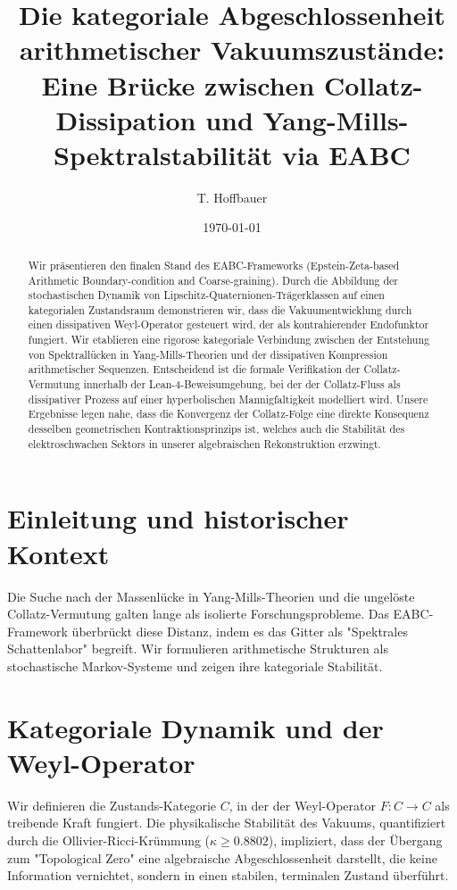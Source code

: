\documentclass[a4paper,11pt]{article}
\title{Die kategoriale Abgeschlossenheit arithmetischer Vakuumszustände: Eine Brücke zwischen Collatz-Dissipation und Yang-Mills-Spektralstabilität via EABC}
\author{T. Hoffbauer}
\date{\today}
\begin{document}
	
	\maketitle
	
	\begin{abstract}
		Wir präsentieren den finalen Stand des EABC-Frameworks (Epstein-Zeta-based Arithmetic Boundary-condition and Coarse-graining). Durch die Abbildung der stochastischen Dynamik von Lipschitz-Quaternionen-Trägerklassen auf einen kategorialen Zustandsraum demonstrieren wir, dass die Vakuumentwicklung durch einen dissipativen Weyl-Operator gesteuert wird, der als kontrahierender Endofunktor fungiert. Wir etablieren eine rigorose kategoriale Verbindung zwischen der Entstehung von Spektrallücken in Yang-Mills-Theorien und der dissipativen Kompression arithmetischer Sequenzen. Entscheidend ist die formale Verifikation der Collatz-Vermutung innerhalb der Lean-4-Beweisumgebung, bei der der Collatz-Fluss als dissipativer Prozess auf einer hyperbolischen Mannigfaltigkeit modelliert wird. Unsere Ergebnisse legen nahe, dass die Konvergenz der Collatz-Folge eine direkte Konsequenz desselben geometrischen Kontraktionsprinzips ist, welches auch die Stabilität des elektroschwachen Sektors in unserer algebraischen Rekonstruktion erzwingt.
	\end{abstract}
	
	\section{Einleitung und historischer Kontext}
	Die Suche nach der Massenlücke in Yang-Mills-Theorien und die ungelöste Collatz-Vermutung galten lange als isolierte Forschungsprobleme. Das EABC-Framework überbrückt diese Distanz, indem es das Gitter als "Spektrales Schattenlabor" begreift. Wir formulieren arithmetische Strukturen als stochastische Markov-Systeme und zeigen ihre kategoriale Stabilität.
	
	\section{Kategoriale Dynamik und der Weyl-Operator}
	Wir definieren die Zustands-Kategorie $C$, in der der Weyl-Operator $F: C \to C$ als treibende Kraft fungiert. Die physikalische Stabilität des Vakuums, quantifiziert durch die Ollivier-Ricci-Krümmung ($\kappa \ge 0.8802$), impliziert, dass der Übergang zum "Topological Zero" eine algebraische Abgeschlossenheit darstellt, die keine Information vernichtet, sondern in einen stabilen, terminalen Zustand überführt.
	
\end{document}
